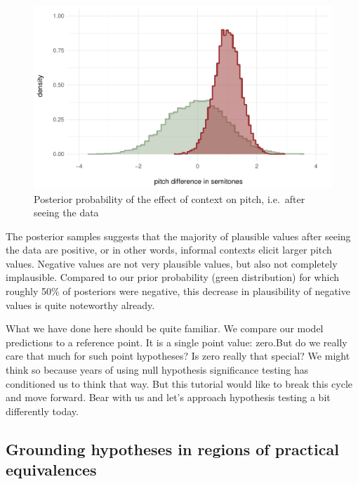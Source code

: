 \documentclass[
  doc,
  longtable,
  nolmodern,
  notxfonts,
  notimes,
  colorlinks=true,linkcolor=blue,citecolor=blue,urlcolor=blue]{apa7}
\begin{document}
\begin{figure}[H]

\caption{Posterior probability of the effect of context on pitch,
i.e.~after seeing the data}

{\centering \includegraphics{manuscript_files/figure-pdf/plot-posterior-1.pdf}

}

\end{figure}%

The posterior samples suggests that the majority of plausible values
after seeing the data are positive, or in other words, informal contexts
elicit larger pitch values. Negative values are not very plausible
values, but also not completely implausible. Compared to our prior
probability (green distribution) for which roughly 50\% of posteriors
were negative, this decrease in plausibility of negative values is quite
noteworthy already.

What we have done here should be quite familiar. We compare our model
predictions to a reference point. It is a single point value: zero.But
do we really care that much for such point hypotheses? Is zero really
that special? We might think so because years of using null hypothesis
significance testing has conditioned us to think that way. But this
tutorial would like to break this cycle and move forward. Bear with us
and let's approach hypothesis testing a bit differently today.

\subsection{Grounding hypotheses in regions of practical
equivalences}\label{grounding-hypotheses-in-regions-of-practical-equivalences}
\end{document}
